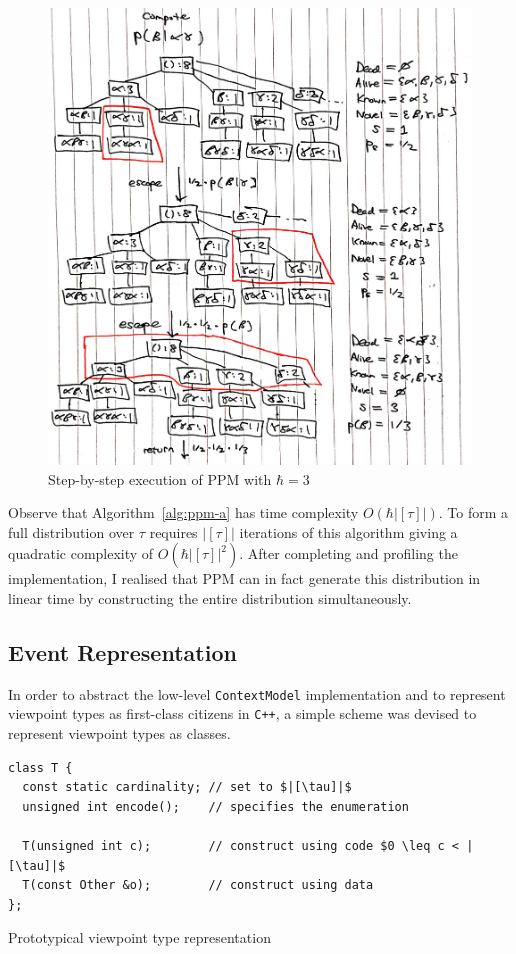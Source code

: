 \documentclass[12pt,a4paper,twoside,openright]{report}
\begin{document}
\begin{figure}[H]
\centering
\includegraphics[width=400pt]{figs/ppm_stepwise_tmp.jpg}
\caption{Step-by-step execution of PPM with $\hbar = 3$}
\label{fig:ppm-stepwise}
\end{figure}

Observe that Algorithm~\ref{alg:ppm-a} has time complexity $O(\hbar|[\tau]|)$.
To form a full distribution over $\tau$ requires $|[\tau]|$ iterations of this
algorithm giving a quadratic complexity of $O(\hbar|[\tau]|^2)$. After
completing and profiling the implementation, I realised that PPM can in fact
generate this distribution in linear time by constructing the entire
distribution simultaneously.

\subsection{Event Representation}\label{sec:cpp-event-rep}

In order to abstract the low-level \texttt{ContextModel} implementation and to
represent viewpoint types as first-class citizens in \texttt{C++}, a simple
scheme was devised to represent viewpoint types as classes.

\begin{listing}[H]
  \begin{verbatim}
class T {
  const static cardinality; // set to $|[\tau]|$
  unsigned int encode();    // specifies the enumeration

  T(unsigned int c);        // construct using code $0 \leq c < |[\tau]|$
  T(const Other &o);        // construct using data 
};
  \end{verbatim}
  \caption{Prototypical viewpoint type representation}
  \label{lst:event-rep}
\end{listing}
\end{document}
